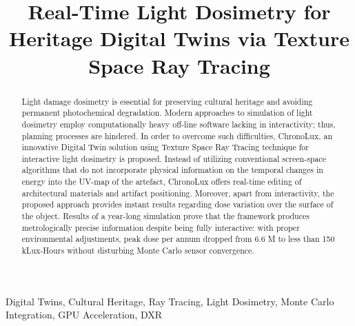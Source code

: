 \documentclass[conference]{IEEEtran}
\begin{document}
\title{Real-Time Light Dosimetry for Heritage Digital Twins via Texture Space Ray Tracing}

\author{
    \and
}

\maketitle

\begin{abstract}
    Light damage dosimetry is essential for preserving cultural heritage and avoiding permanent photochemical degradation. Modern approaches to simulation of light dosimetry employ computationally heavy off-line software lacking in interactivity; thus, planning processes are hindered. In order to overcome such difficulties, ChronoLux, an innovative Digital Twin solution using Texture Space Ray Tracing technique for interactive light dosimetry is proposed. Instead of utilizing conventional screen-space algorithms that do not incorporate physical information on the temporal changes in energy into the UV-map of the artefact, ChronoLux offers real-time editing of architectural materials and artifact positioning. Moreover, apart from interactivity, the proposed approach provides instant results regarding dose variation over the surface of the object. Results of a year-long simulation prove that the framework produces metrologically precise information despite being fully interactive: with proper environmental adjustments, peak dose per annum dropped from 6.6 M to less than 150 kLux-Hours without disturbing Monte Carlo sensor convergence.
\end{abstract}

\begin{IEEEkeywords}
    Digital Twins, Cultural Heritage, Ray Tracing, Light Dosimetry, Monte Carlo Integration, GPU Acceleration, DXR
\end{IEEEkeywords}
\end{document}
